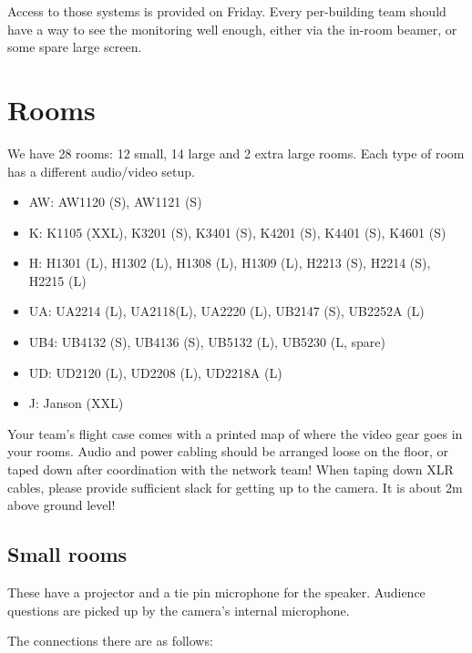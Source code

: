 \documentclass{article}
\begin{document}
Access to those systems is provided on Friday. Every per-building team should have a way to see the monitoring well enough, either via the in-room beamer, or some spare large screen.



\section{Rooms}
We have 28 rooms: 12 small, 14 large and 2 extra large rooms. Each type of room has a different audio/video setup.
\begin{itemize}
  \item AW: AW1120 (S), AW1121 (S)
  \item K: K1105 (XXL), K3201 (S), K3401 (S), K4201 (S), K4401 (S), K4601 (S)
  \item H: H1301 (L), H1302 (L), H1308 (L), H1309 (L), H2213 (S), H2214 (S), H2215 (L)
  \item UA: UA2214 (L), UA2118(L), UA2220 (L), UB2147 (S), UB2252A (L)
  \item UB4: UB4132 (S), UB4136 (S), UB5132 (L), UB5230 (L, spare)
  \item UD: UD2120 (L), UD2208 (L), UD2218A (L)
  \item J: Janson (XXL)
\end{itemize}

Your team's flight case comes with a printed map of where the video gear goes in your rooms. Audio and power cabling should be arranged loose on the floor, or taped down after coordination with the network team! When taping down XLR cables, please provide sufficient slack for getting up to the camera. It is about 2m above ground level!

\subsection{Small rooms}
These have a projector and a tie pin microphone for the speaker. Audience questions are picked up by the camera's internal microphone.

The connections there are as follows:
\end{document}
